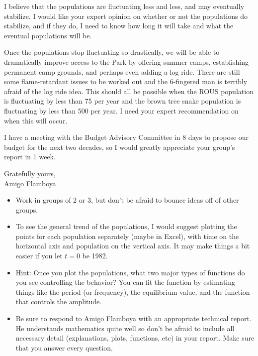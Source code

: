 \begin{lab}
I believe that the populations are fluctuating less and less, and may eventually
stabilize. I would like your expert opinion on whether or not the populations do stabilize,
and if they do, I need to know how long it will take and what the eventual populations
will be.

Once the populations stop fluctuating so drastically, we will be able to dramatically
improve access to the Park by offering summer camps, establishing permanent camp grounds,
and perhaps even adding a log ride.  There are still some flame-retardant issues
to be worked out and the 6-fingered man is terribly afraid of the log ride idea.  This
should all be possible when the ROUS population is fluctuating by less than 75 per year
and the brown tree snake population is fluctuating by less than 500 per year.  I need your
expert recommendation on when this will occur.

I have a meeting with the Budget Advisory Committee in 8 days to propose our budget
for the next two decades, so I would greatly appreciate your group's report in 1 week.

\vspace{0.2in}
\noindent Gratefully yours, \\
Amigo Flamboya

\vspace{0.5in}
\begin{itemize}
    \item Work in groups of 2 or 3, but don't be afraid to bounce ideas off of other
        groups.
    \item To see the general trend of the populations, I would suggest plotting the points
        for each population separately (maybe in Excel), with time on the horizontal axis
        and population on the vertical axis. It may make things a bit easier if you let
        $t=0$ be 1982.
    \item Hint: Once you plot the populations, what two major types of functions do you
        see controlling the behavior?  You can fit the function by estimating things like
        the period (or frequency), the equilibrium value, and the function that controls
        the amplitude.  
    \item Be sure to respond to Amigo Flamboya with an appropriate technical report.  He
        understands mathematics quite well so don't be afraid to include all necessary
        detail (explanations, plots, functions, etc) in your report. Make sure that you
        answer every question.
\end{itemize}
\end{lab}
